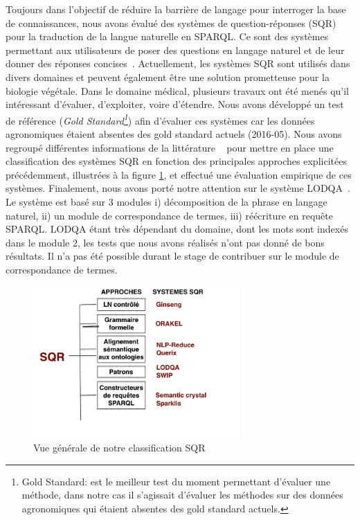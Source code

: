 Toujours dans l'objectif de réduire la barrière de langage pour interroger la base de connaissances, nous avons évalué des systèmes de question-réponses (SQR) pour la traduction de la langue naturelle en SPARQL. Ce sont des systèmes permettant aux utilisateurs de poser des questions en langage naturel et de leur donner des réponses concises~\cite{HirschmanGaizauskas2001,Lopez-al2011}. Actuellement, les systèmes SQR sont utilisés dans divers domaines et peuvent également être une solution prometteuse pour la biologie végétale. Dans le domaine médical, plusieurs travaux ont été menés qu'il intéressant d’évaluer, d'exploiter, voire d’étendre. Nous avons développé un test de référence (\textit{Gold Standard\footnote{Gold Standard: est le meilleur test du moment permettant d'évaluer une méthode, dans notre cas il s'agissait d'évaluer les méthodes sur des données agronomiques qui étaient absentes des gold standard actuels.}}) afin d'évaluer ces systèmes car les données agronomiques étaient absentes des gold standard actuels (2016-05). Nous avons regroupé différentes informations de la littérature ~\cite{HirschmanGaizauskas2001,Lopez-al2011,Moldovan-al2002,NevesLeser2015} pour mettre en place une classification des systèmes SQR en fonction des principales approches explicitées précédemment, illustrées à la figure \ref{SQR}, et effectué une évaluation empirique de ces systèmes. Finalement, nous avons porté notre attention sur le système LODQA~\cite{KimCohen2013}. Le système est basé sur 3 modules i) décomposition de la phrase en langage naturel, ii) un module de correspondance de termes, iii) réécriture en requête SPARQL. LODQA étant très dépendant du domaine, dont les mots sont indexés dans le module 2, les tests que nous avons réalisés n'ont pas donné de bons résultats. Il n'a pas été possible durant le stage de contribuer sur le module de correspondance de termes.

\begin{figure}[!ht]
\begin{center}
	\includegraphics[width=0.70\textwidth]{Figures/classificationSQR.png}
\end{center}
\label{SQR}
\caption{ Vue générale de notre classification SQR}
\end{figure}

